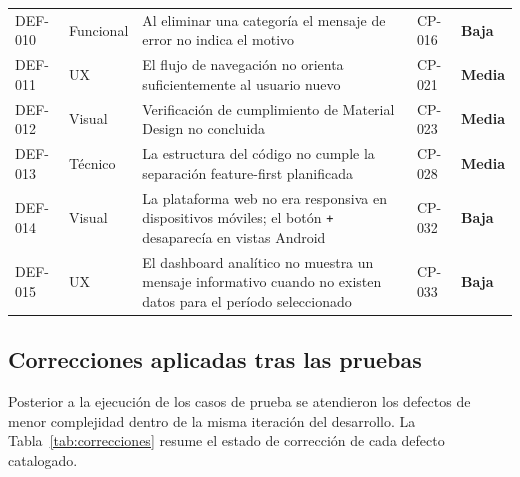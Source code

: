 \begin{longtable}{>{\small}p{1.3cm} >{\small}p{1.9cm} >{\small}p{6.6cm} >{\small}p{1.5cm} >{\small}p{2.4cm}}
  DEF-010 & Funcional & Al eliminar una categoría el mensaje de error no indica el motivo              & CP-016          & \textcolor{OliveGreen}{\textbf{Baja}}   \\[4pt]
  DEF-011 & UX        & El flujo de navegación no orienta suficientemente al usuario nuevo             & CP-021          & \textcolor{BurntOrange}{\textbf{Media}} \\[4pt]
  DEF-012 & Visual    & Verificación de cumplimiento de Material Design no concluida                   & CP-023          & \textcolor{BurntOrange}{\textbf{Media}} \\[4pt]
  DEF-013 & Técnico   & La estructura del código no cumple la separación feature-first planificada      & CP-028          & \textcolor{BurntOrange}{\textbf{Media}} \\[4pt]
  DEF-014 & Visual    & La plataforma web no era responsiva en dispositivos móviles; el botón \texttt{+} desaparecía en vistas Android & CP-032 & \textcolor{OliveGreen}{\textbf{Baja}}   \\[4pt]
  DEF-015 & UX        & El dashboard analítico no muestra un mensaje informativo cuando no existen datos para el período seleccionado & CP-033 & \textcolor{OliveGreen}{\textbf{Baja}}   \\
\end{longtable}

\subsection{Correcciones aplicadas tras las pruebas}

Posterior a la ejecución de los casos de prueba se atendieron los defectos de menor complejidad dentro de la misma iteración del desarrollo. La Tabla~\ref{tab:correcciones} resume el estado de corrección de cada defecto catalogado.

